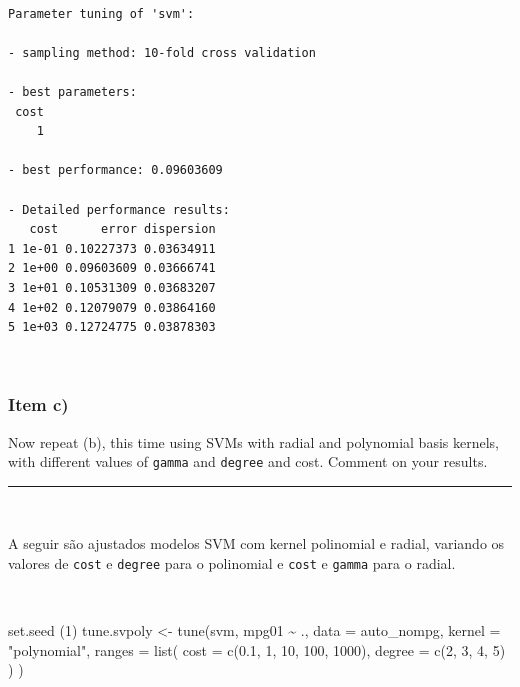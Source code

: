 \documentclass[
  a4paperpaper,
]{article}
\newenvironment{Shaded}{\begin{snugshade}}{\end{snugshade}}
\newcommand{\AttributeTok}[1]{\textcolor[rgb]{0.40,0.45,0.13}{#1}}
\newcommand{\DecValTok}[1]{\textcolor[rgb]{0.68,0.00,0.00}{#1}}
\newcommand{\FloatTok}[1]{\textcolor[rgb]{0.68,0.00,0.00}{#1}}
\newcommand{\FunctionTok}[1]{\textcolor[rgb]{0.28,0.35,0.67}{#1}}
\newcommand{\NormalTok}[1]{\textcolor[rgb]{0.00,0.23,0.31}{#1}}
\newcommand{\OtherTok}[1]{\textcolor[rgb]{0.00,0.23,0.31}{#1}}
\newcommand{\SpecialCharTok}[1]{\textcolor[rgb]{0.37,0.37,0.37}{#1}}
\newcommand{\StringTok}[1]{\textcolor[rgb]{0.13,0.47,0.30}{#1}}
\begin{document}
\begin{verbatim}

Parameter tuning of 'svm':

- sampling method: 10-fold cross validation 

- best parameters:
 cost
    1

- best performance: 0.09603609 

- Detailed performance results:
   cost      error dispersion
1 1e-01 0.10227373 0.03634911
2 1e+00 0.09603609 0.03666741
3 1e+01 0.10531309 0.03683207
4 1e+02 0.12079079 0.03864160
5 1e+03 0.12724775 0.03878303
\end{verbatim}

~

\subsubsection{Item c)}\label{item-c-3}

Now repeat (b), this time using SVMs with radial and polynomial basis
kernels, with different values of \texttt{gamma} and \texttt{degree} and
cost. Comment on your results.

\begin{center}\rule{0.5\linewidth}{0.5pt}\end{center}

~

A seguir são ajustados modelos SVM com kernel polinomial e radial,
variando os valores de \texttt{cost} e \texttt{degree} para o polinomial
e \texttt{cost} e \texttt{gamma} para o radial.

~

\begin{Shaded}
\begin{Highlighting}[]
\FunctionTok{set.seed}\NormalTok{ (}\DecValTok{1}\NormalTok{)}
\NormalTok{tune.svpoly }\OtherTok{\textless{}{-}} \FunctionTok{tune}\NormalTok{(svm, mpg01 }\SpecialCharTok{\textasciitilde{}}\NormalTok{ ., }\AttributeTok{data =}\NormalTok{ auto\_nompg,}
                   \AttributeTok{kernel =} \StringTok{"polynomial"}\NormalTok{,}
                   \AttributeTok{ranges =} \FunctionTok{list}\NormalTok{(}
                     \AttributeTok{cost =} \FunctionTok{c}\NormalTok{(}\FloatTok{0.1}\NormalTok{, }\DecValTok{1}\NormalTok{, }\DecValTok{10}\NormalTok{, }\DecValTok{100}\NormalTok{, }\DecValTok{1000}\NormalTok{),}
                     \AttributeTok{degree =} \FunctionTok{c}\NormalTok{(}\DecValTok{2}\NormalTok{, }\DecValTok{3}\NormalTok{, }\DecValTok{4}\NormalTok{, }\DecValTok{5}\NormalTok{)}
\NormalTok{                   )}
\NormalTok{)}
\end{Highlighting}
\end{Shaded}
\end{document}

